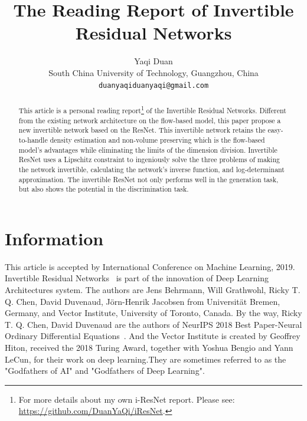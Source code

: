 \documentclass[final]{cvpr}
\begin{document}
\title{The Reading Report of Invertible Residual Networks}

\author{Yaqi Duan\\
South China University of Technology, Guangzhou, China\\
{\tt\small duanyaqiduanyaqi@gmail.com}
}

\maketitle


\begin{abstract}
This article is a personal reading report\footnote {For more details about my own i-ResNet report. Please see: \url{https://github.com/DuanYaQi/iResNet}.}  of the Invertible Residual Networks. Different from the existing network architecture on the flow-based model, this paper propose a new invertible network based on the ResNet. This invertible network retains the easy-to-handle density estimation and non-volume preserving which is the flow-based model's advantages while eliminating the limits of the dimension division. Invertible ResNet uses a Lipschitz constraint to ingeniously solve the three problems of making the network invertible, calculating the network's inverse function, and log-determinant approximation. The invertible ResNet not only performs well in the generation task, but also shows the potential in the discrimination task.
\end{abstract}

\section{Information}

This article is accepted by International Conference on Machine Learning, 2019. Invertible Residual Networks~\cite{behrmann2019invertible} is part of the innovation of Deep Learning Architectures system. The authors are Jens Behrmann, Will Grathwohl, Ricky T. Q. Chen, David Duvenaud, Jörn-Henrik Jacobsen from Universität Bremen, Germany, and Vector Institute, University of Toronto, Canada. By the way, Ricky T. Q. Chen, David Duvenaud are the authors of NeurIPS 2018 Best Paper-Neural Ordinary Differential Equations~\cite{chen2018neural}. And the Vector Institute is created by Geoffrey Hiton, received the 2018 Turing Award, together with Yoshua Bengio and Yann LeCun, for their work on deep learning.They are sometimes referred to as the "Godfathers of AI" and "Godfathers of Deep Learning".
\end{document}
